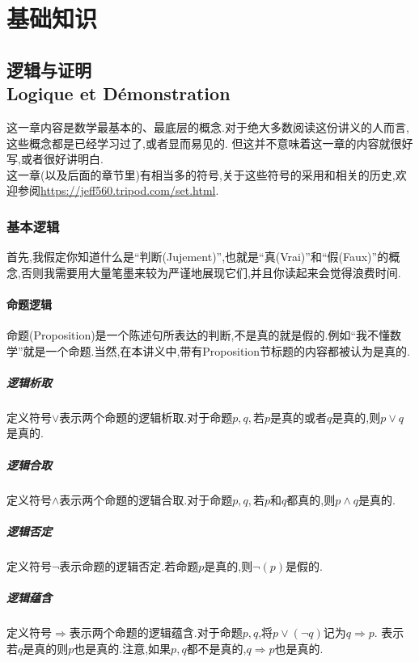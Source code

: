 \documentclass[12pt, a4paper, oneside]{ctexbook}
\begin{document}
\newpage
{}
\setcounter{page}{1}
\tableofcontents
\newpage
\setcounter{page}{1}

\part{基础知识}
\chapter{逻辑与证明\\ Logique et Démonstration}
  这一章内容是数学最基本的、最底层的概念.对于绝大多数阅读这份讲义的人而言,这些概念都是已经学习过了,或者显而易见的.
  但这并不意味着这一章的内容就很好写,或者很好讲明白.\\

  这一章(以及后面的章节里)有相当多的符号,关于这些符号的采用和相关的历史,欢迎参阅\url{https://jeff560.tripod.com/set.html}.
  \section{基本逻辑}
  首先,我假定你知道什么是“判断(Jujement)”,也就是“真(Vrai)”和“假(Faux)”的概念,否则我需要用大量笔墨来较为严谨地展现它们,并且你读起来会觉得浪费时间.
  \subsection{命题逻辑}
  命题(Proposition)是一个陈述句所表达的判断,不是真的就是假的.例如“我不懂数学”就是一个命题.当然,在本讲义中,带有Proposition节标题的内容都被认为是真的.
  \subsubsection{逻辑析取}
  定义符号$\lor $表示两个命题的逻辑析取.对于命题$p,q,\text{若}p$是真的或者$q$是真的,则$p\lor q$是真的.
  \subsubsection{逻辑合取}
  定义符号$\land  $表示两个命题的逻辑合取.对于命题$p,q,\text{若}p$和$q$都真的,则$p\land q$是真的.
  \subsubsection{逻辑否定}
  定义符号$\lnot $表示命题的逻辑否定.若命题$p$是真的,则$\lnot(p)$是假的.
  \subsubsection{逻辑蕴含}
  定义符号$\Rightarrow$表示两个命题的逻辑蕴含.对于命题$p,q$,将$p\lor(\lnot q)$记为$q\Rightarrow p$.
  表示若$q$是真的则$p$也是真的.注意,如果$p,q$都不是真的,$q\Rightarrow p$也是真的.
\end{document}
